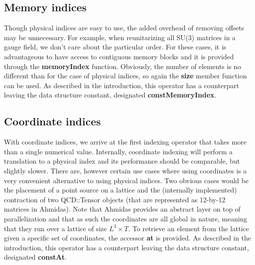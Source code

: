 \documentclass[a4paper,12pt,twoside]{article}
\begin{document}
\subsection{Memory indices}
Though physical indices are easy to use, the added overhead of removing offsets may be unnecessary. For example, when reunitarizing all SU(3) matrices in a gauge field, we don't care about the particular order. For these cases, it is advantageous to have access to contiguous memory blocks and it is provided through the \textbf{memoryIndex} function. Obviously, the number of elements is no different than for the case of physical indices, so again the \textbf{size} member function can be used. As described in the introduction, this operator has a counterpart leaving the data structure constant, designated \textbf{constMemoryIndex}.

\subsection{Coordinate indices}
With coordinate indices, we arrive at the first indexing operator that takes more than a single numerical value. Internally, coordinate indexing will perform a translation to a physical index and its performance should be comparable, but slightly slower. There are, however certain use cases where using coordinates is a very convenient alternative to using physical indices. Two obvious cases would be the placement of a point source on a lattice and the (internally implemented) contraction of two QCD::Tensor objects (that are represented as 12-by-12 matrices in Ahmidas). Note that Ahmidas provides an abstract layer on top of parallelization and that as such the coordinates are all global in nature, meaning that they run over a lattice of size $L^3\times T$. To retrieve an element from the lattice given a specific set of coordinates, the accessor \textbf{at} is provided. As described in the introduction, this operator has a counterpart leaving the data structure constant, designated \textbf{constAt}.
\end{document}
